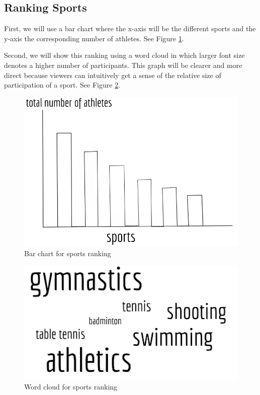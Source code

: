 \documentclass[
]{article}
\begin{document}
\hypertarget{plans-ranking}{%
\subsection{Ranking Sports}\label{plans-ranking}}

First, we will use a bar chart where the x-axis will be the different sports and the y-axis the corresponding number of athletes. See Figure \ref{fig:figure19}.

Second, we will show this ranking using a word cloud in which larger font size denotes a higher number of participants. This graph will be clearer and more direct because viewers can intuitively get a sense of the relative size of participation of a sport. See Figure \ref{fig:figure20}.

\begin{figure}

{\centering \includegraphics[width=0.85\linewidth]{static/pics/7} 

}

\caption{Bar chart for sports ranking}\label{fig:figure19}
\end{figure}

\begin{figure}

{\centering \includegraphics[width=0.85\linewidth]{static/pics/8} 

}

\caption{Word cloud for sports ranking}\label{fig:figure20}
\end{figure}
\end{document}
